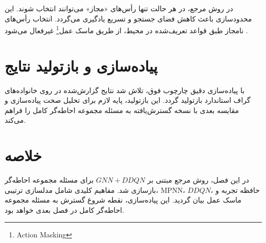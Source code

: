 در روش مرجع، در هر حالت تنها رأس‌های «مجاز» می‌توانند انتخاب شوند. این محدودسازی باعث کاهش فضای جستجو و تسریع یادگیری می‌گردد. انتخاب رأس‌های نامجاز طبق قواعد تعریف‌شده در محیط، از طریق ماسک عمل\footnote{Action Masking} غیرفعال می‌شود \cite{chen2024dsp}.

\section{پیاده‌سازی و بازتولید نتایج}

با پیاده‌سازی دقیق چارچوب فوق، تلاش شد نتایج گزارش‌شده در \cite{chen2024dsp} روی خانواده‌های گراف استاندارد بازتولید گردد. این بازتولید، پایه لازم برای تحلیل صحت پیاده‌سازی و مقایسه بعدی با نسخه گسترش‌یافته به مسئله مجموعه احاطه‌گر کامل را فراهم می‌کند.

\section{خلاصه}

در این فصل، روش مرجع مبتنی بر $GNN + DDQN$ برای مسئله مجموعه احاطه‌گر بازسازی شد. مفاهیم کلیدی شامل مدلسازی ترتیبی، MPNN، $DDQN$، حافظه تجربه و ماسک عمل بیان گردید. این پیاده‌سازی، نقطه شروع گسترش به مسئله مجموعه احاطه‌گر کامل در فصل بعدی خواهد بود.
